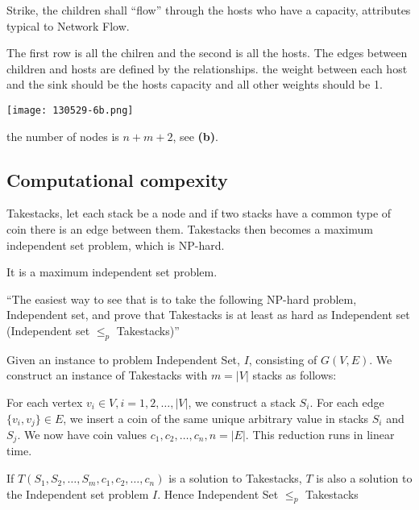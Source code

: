 \documentclass[a4paper]{article}
\newenvironment{task}[1]
{
	\begin{description}[align=right]
		\item [#1]
}{		%
	\end{description}
}
\newcommand{\abs}[1]{\left|#1\right|}
\newcommand{\taskref}[1]{\textbf{#1}}
\DeclareMathOperator{\*}{\cdot}
\begin{document}
\begin{task}{6. (a)}
	 Strike, the children shall ``flow'' through the hosts who have a capacity, attributes typical to Network Flow.
\end{task}

\begin{task}{(b)}
	\qquad The first row is all the chilren and the second is all the hosts. The edges between children and hosts are defined by the relationships. the weight between each host and the sink should be the hosts capacity and all other weights should be 1.
	
	\texttt{[image: 130529-6b.png]}
\end{task}

\begin{task}{(c)}
	 the number of nodes is $n+m+2$, see \taskref{(b)}.
\end{task}

\subsection*{Computational compexity}

\begin{task}{7. (a)}
	 Takestacks, let each stack be a node and if two stacks have a common type of coin there is an edge between them. Takestacks then becomes a maximum independent set problem, which is NP-hard.
\end{task}

\begin{task}{(b)}
	 It is a maximum independent set problem.
\end{task}

\begin{task}{(c)}
	 ``The easiest way to see that is to take the following NP-hard problem, Independent set, and prove that Takestacks is at least as hard as Independent set (Independent set $\leq_p$ Takestacks)''
\end{task}

\begin{task}{(d)}
	\qquad Given an instance to problem Independent Set, $I$, consisting of $G(V,E)$. We construct an instance of Takestacks with $m=\abs{V}$ stacks as follows: 
	
	For each vertex $v_i\in V,i=1,2,\ldots,\abs{V}$, we construct a stack $S_i$. For each edge $\{v_i,v_j\}\in E$, we insert a coin of the same unique arbitrary value in stacks $S_i$ and $S_j$. We now have coin values $c_1,c_2,\ldots,c_n,n=\abs{E}$. This reduction runs in linear time.
	
	If $T(S_1,S_2,\ldots,S_m,c_1,c_2,\ldots,c_n)$ is a solution to Takestacks, $T$ is also a solution to the Independent set problem $I$.
	Hence Independent Set $\leq_p$ Takestacks
\end{task}
\end{document}
